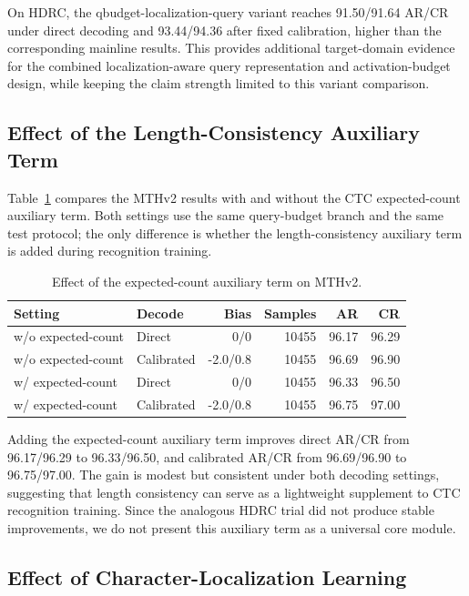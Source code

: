 On HDRC, the qbudget-localization-query variant reaches 91.50/91.64 AR/CR under direct decoding and 93.44/94.36 after fixed calibration, higher than the corresponding mainline results. This provides additional target-domain evidence for the combined localization-aware query representation and activation-budget design, while keeping the claim strength limited to this variant comparison.

\subsection{Effect of the Length-Consistency Auxiliary Term}

Table~\ref{tab:expected-count} compares the MTHv2 results with and without the CTC expected-count auxiliary term. Both settings use the same query-budget branch and the same test protocol; the only difference is whether the length-consistency auxiliary term is added during recognition training.

\begin{table}[t]
\centering
\caption{Effect of the expected-count auxiliary term on MTHv2.}
\label{tab:expected-count}
\begin{tabular}{llrrrr}
\toprule
Setting & Decode & Bias & Samples & AR & CR \\
\midrule
w/o expected-count & Direct & 0/0 & 10455 & 96.17 & 96.29 \\
w/o expected-count & Calibrated & -2.0/0.8 & 10455 & 96.69 & 96.90 \\
w/ expected-count & Direct & 0/0 & 10455 & 96.33 & 96.50 \\
w/ expected-count & Calibrated & -2.0/0.8 & 10455 & 96.75 & 97.00 \\
\bottomrule
\end{tabular}
\end{table}

Adding the expected-count auxiliary term improves direct AR/CR from 96.17/96.29 to 96.33/96.50, and calibrated AR/CR from 96.69/96.90 to 96.75/97.00. The gain is modest but consistent under both decoding settings, suggesting that length consistency can serve as a lightweight supplement to CTC recognition training. Since the analogous HDRC trial did not produce stable improvements, we do not present this auxiliary term as a universal core module.

\subsection{Effect of Character-Localization Learning}

